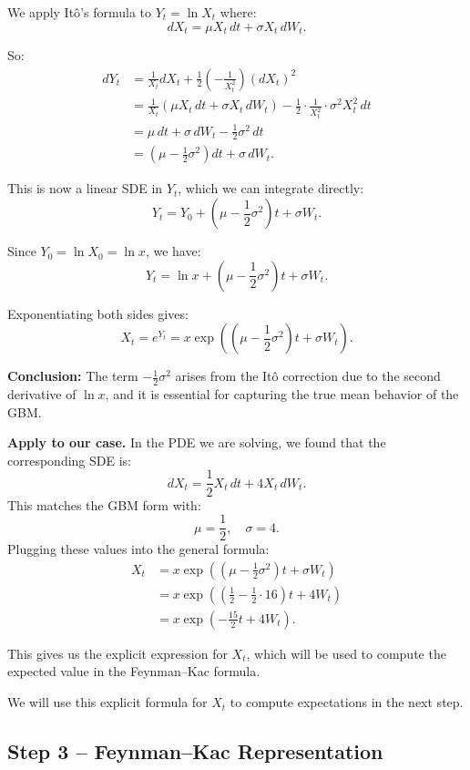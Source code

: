 We apply Itô's formula to \( Y_t = \ln X_t \) where:
\[
dX_t = \mu X_t\,dt + \sigma X_t\,dW_t.
\]

So:
\[
\begin{aligned}
dY_t &= \frac{1}{X_t} dX_t + \frac{1}{2} \left(-\frac{1}{X_t^2}\right) (dX_t)^2 \\
     &= \frac{1}{X_t} (\mu X_t\,dt + \sigma X_t\,dW_t) - \frac{1}{2} \cdot \frac{1}{X_t^2} \cdot \sigma^2 X_t^2\,dt \\
     &= \mu\,dt + \sigma\,dW_t - \frac{1}{2} \sigma^2\,dt \\
     &= \left( \mu - \frac{1}{2} \sigma^2 \right) dt + \sigma\,dW_t.
\end{aligned}
\]

This is now a linear SDE in \( Y_t \), which we can integrate directly:
\[
Y_t = Y_0 + \left( \mu - \frac{1}{2} \sigma^2 \right)t + \sigma W_t.
\]

Since \( Y_0 = \ln X_0 = \ln x \), we have:
\[
Y_t = \ln x + \left( \mu - \frac{1}{2} \sigma^2 \right)t + \sigma W_t.
\]

Exponentiating both sides gives:
\[
X_t = e^{Y_t} = x \exp\left( \left( \mu - \frac{1}{2} \sigma^2 \right)t + \sigma W_t \right).
\]

\textbf{Conclusion:}  
The term \( -\frac{1}{2} \sigma^2 \) arises from the Itô correction due to the second derivative of \( \ln x \), and it is essential for capturing the true mean behavior of the GBM.

\textbf{Apply to our case.}  
In the PDE we are solving, we found that the corresponding SDE is:
\[
dX_t = \frac{1}{2} X_t\,dt + 4 X_t\,dW_t.
\]
This matches the GBM form with:
\[
\mu = \frac{1}{2}, \quad \sigma = 4.
\]
Plugging these values into the general formula:
\begin{align*}
X_t &= x \exp\left( \left( \mu - \frac{1}{2} \sigma^2 \right)t + \sigma W_t \right) \\
    &= x \exp\left( \left( \frac{1}{2} - \frac{1}{2} \cdot 16 \right)t + 4W_t \right) \\
    &= x \exp\left( -\frac{15}{2}t + 4W_t \right).
\end{align*}

This gives us the explicit expression for \( X_t \), which will be used to compute the expected value in the Feynman–Kac formula.

We will use this explicit formula for \( X_t \) to compute expectations in the next step.

\subsection*{Step 3 – Feynman–Kac Representation}

